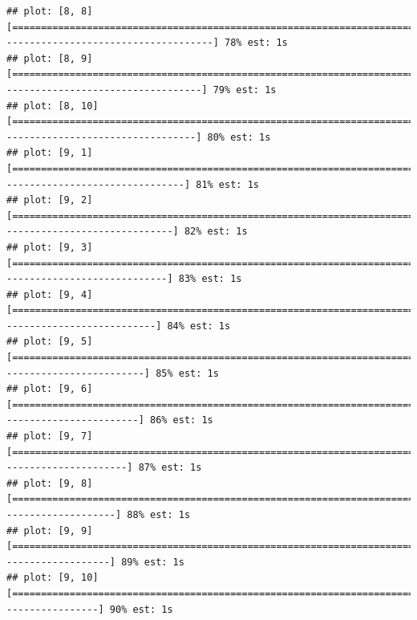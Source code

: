 \documentclass[
]{article}
\begin{document}
\begin{verbatim}
## plot: [8, 8] [===================================================================================================================================>-------------------------------------] 78% est: 1s 
## plot: [8, 9] [=====================================================================================================================================>-----------------------------------] 79% est: 1s 
## plot: [8, 10] [=====================================================================================================================================>----------------------------------] 80% est: 1s 
## plot: [9, 1] [========================================================================================================================================>--------------------------------] 81% est: 1s 
## plot: [9, 2] [==========================================================================================================================================>------------------------------] 82% est: 1s 
## plot: [9, 3] [===========================================================================================================================================>-----------------------------] 83% est: 1s 
## plot: [9, 4] [=============================================================================================================================================>---------------------------] 84% est: 1s 
## plot: [9, 5] [===============================================================================================================================================>-------------------------] 85% est: 1s 
## plot: [9, 6] [================================================================================================================================================>------------------------] 86% est: 1s 
## plot: [9, 7] [==================================================================================================================================================>----------------------] 87% est: 1s 
## plot: [9, 8] [====================================================================================================================================================>--------------------] 88% est: 1s 
## plot: [9, 9] [=====================================================================================================================================================>-------------------] 89% est: 1s 
## plot: [9, 10] [======================================================================================================================================================>-----------------] 90% est: 1s 

\end{verbatim}
\end{document}
